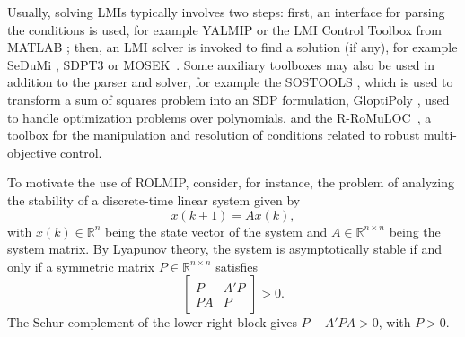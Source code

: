 \documentclass[english,11pt]{article}
\theoremstyle{break} \theorembodyfont{\small\rm}
\begin{document}
Usually, solving LMIs typically involves two steps: first, an interface for parsing the conditions is
used, for example YALMIP \cite{Lof:04} or the LMI Control Toolbox from
MATLAB \cite{GNLC:95}; then, an LMI solver is invoked to find a solution (if any),
for example SeDuMi \cite{Stu:99}, SDPT3 \cite{TTT:99} or MOSEK~\cite{AA:00}. Some auxiliary toolboxes
may also be used in addition to the parser and solver, for example the SOSTOOLS
\cite{PPSP:04}, which is used to transform a sum of squares problem into an SDP
formulation, GloptiPoly \cite{HL:03c}, used to handle optimization problems
over polynomials, and the R-RoMuLOC~\cite{rromuloc,rromulocconf,romulocconf,ractconf}, a toolbox for the manipulation and
resolution of conditions related to robust multi-objective control.

To motivate the use of ROLMIP, consider, for instance, the problem of analyzing the
stability of a discrete-time linear system given by
\begin{equation}\label{eq_discr_system}
 x(k+1) = Ax(k),
\end{equation}
with $x(k) \in \mathbb{R}^n$ being the state vector of the system and $A \in \mathbb{R}^{n \times n}$
being the system matrix. By Lyapunov theory, the system is
asymptotically stable if and only if a symmetric matrix
$P\in\mathbb{R}^{n\times n}$ satisfies
\begin{equation}\label{eq_estab_discr}
 \begin{bmatrix} P & A'P \\ PA & P \end{bmatrix} > 0.
\end{equation}
The Schur complement of the lower-right block gives
$P-A'PA>0$, with $P>0$.
\end{document}
